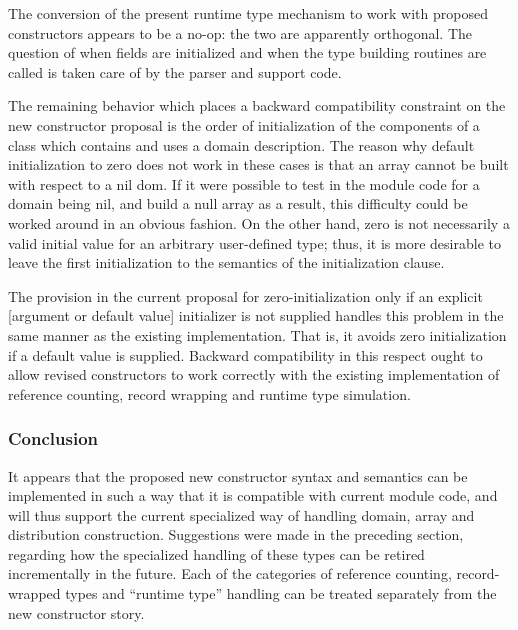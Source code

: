 \begin{chapelexample}
The conversion of the present runtime type mechanism to work with proposed
constructors appears to be a no-op: the two are apparently orthogonal.  The
question of when fields are initialized and when the type building routines are
called is taken care of by the parser and support code.
\end{chapelexample}

The remaining behavior which places a backward compatibility constraint on the
new constructor proposal is the order of initialization of the components of a
class which contains and uses a domain description.  The reason why default
initialization to zero does not work in these cases is that an array cannot be
built with respect to a nil dom.  If it were possible to test in the module code
for a domain being nil, and build a null array as a result, this difficulty
could be worked around in an obvious fashion.  On the other hand, zero is not
necessarily a valid initial value for an arbitrary user-defined type; thus, it
is more desirable to leave the first initialization to the semantics of the
initialization clause.

The provision in the current proposal for zero-initialization only if an
explicit [argument or default value] initializer is not supplied handles this
problem in the same manner as the existing implementation.  That is, it avoids
zero initialization if a default value is supplied.  Backward compatibility in
this respect ought to allow revised constructors to work correctly with the
existing implementation of reference counting, record wrapping and runtime type
simulation.

\subsubsection{Conclusion}

It appears that the proposed new constructor syntax and semantics can be
implemented in such a way that it is compatible with current module code, and
will thus support the current specialized way of handling domain, array and
distribution construction.  Suggestions were made in the preceding section,
regarding how the specialized handling of these types can be retired
incrementally in the future.  Each of the categories of reference counting,
record-wrapped types and ``runtime type'' handling can be treated separately
from the new constructor story.
